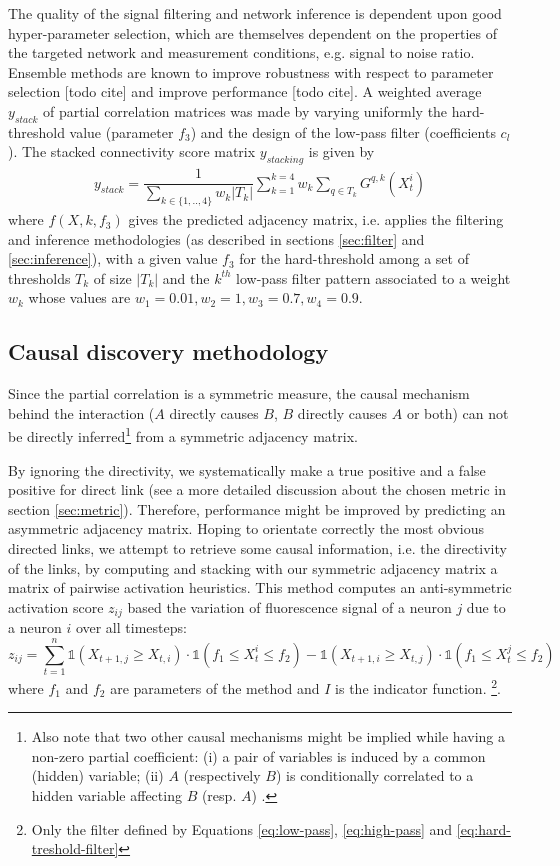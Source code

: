 \documentclass[wcp]{jmlr}
\begin{document}
The quality of the signal filtering and network inference is dependent upon
good hyper-parameter selection, which are themselves dependent on the properties
of the targeted network and measurement conditions, e.g. signal to noise ratio.
Ensemble methods are known to improve robustness with respect to parameter
selection [todo cite] and improve performance [todo cite].
A weighted average $y_{stack}$ of partial correlation matrices was made
by varying uniformly the hard-threshold value (parameter $f_3$) and the design
of the low-pass filter (coefficients $c_l$). The stacked connectivity score
matrix $y_{stacking}$ is given by
\begin{align}
y_{stack} =  \dfrac{1}{\sum_{k\in\{1,..,4\}} w_k |T_k|} \sum_{k=1}^{k=4}  w_k \sum_{q \in T_k} G^{q,k}(X_t^i)
\end{align}
where $f(X, k, f_3)$ gives the predicted adjacency matrix, i.e. applies the
filtering and inference methodologies (as described
in sections \ref{sec:filter} and \ref{sec:inference}), with a  given value
$f_3$ for the hard-threshold among a set of thresholds $T_k$ of size $|T_k|$
and the $k^{th}$ low-pass filter pattern associated to a weight $w_k$ whose
values are $w_1 = 0.01 , w_2 =1, w_3 = 0.7, w_4 = 0.9$.

\subsection{Causal discovery methodology}
Since the partial correlation is a symmetric measure, the causal mechanism behind the
interaction ($A$ directly causes $B$, $B$ directly causes $A$ or both) can not
be directly inferred\footnote{Also note that two other causal mechanisms might be
implied while having a non-zero partial coefficient: (i) a pair of variables
is induced by a common (hidden) variable; (ii) $A$ (respectively $B$) is
conditionally correlated to a hidden variable affecting $B$ (resp. $A$)
\cite{de2004discovery}.} from a symmetric adjacency matrix.

By ignoring the directivity, we systematically make a true positive and a
false positive for direct link (see a more detailed discussion about the
chosen metric in section \ref{sec:metric}). Therefore, performance might be
improved by predicting an asymmetric adjacency matrix. Hoping to orientate
correctly the most obvious directed links, we attempt to retrieve some causal
information, i.e. the directivity of the links, by computing and stacking with
our symmetric adjacency matrix a matrix of pairwise activation heuristics.
This method computes an anti-symmetric activation score $z_{ij}$ based the
variation of fluorescence signal of a neuron $j$ due to a neuron $i$ over all
timesteps:
\[
z_{ij} = \sum_{t=1}^n \mathbb{1}(X_{t+1,j} \ge X_{t, i}) \cdot
\mathbb{1}(f_1\le X_t^i \le f_2) -  \mathbb{1}(X_{t+1,i} \ge X_{t, j}) \cdot
\mathbb{1}(f_1 \le X_t^j \le f_2)
\]
where $f_1$ and $f_2$ are parameters of the method and $I$ is the indicator
function. \footnote{Only the filter defined by Equations \ref{eq:low-pass},
\ref{eq:high-pass} and \ref{eq:hard-treshold-filter}}.
\end{document}
